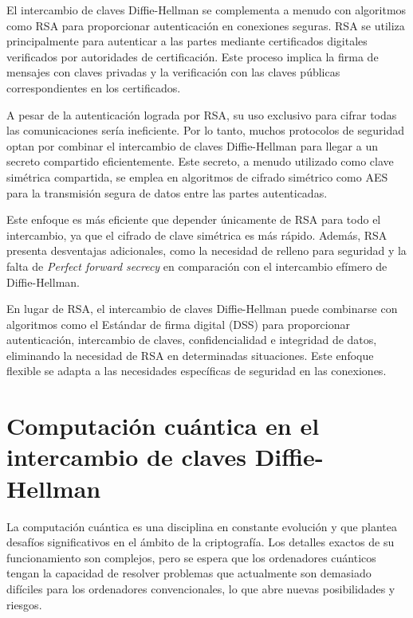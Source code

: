 \documentclass[11pt]{article}
\begin{document}
El intercambio de claves Diffie-Hellman se complementa a menudo con algoritmos como RSA para proporcionar autenticación en conexiones seguras. RSA se utiliza principalmente para autenticar a las partes mediante certificados digitales verificados por autoridades de certificación. Este proceso implica la firma de mensajes con claves privadas y la verificación con las claves públicas correspondientes en los certificados.

A pesar de la autenticación lograda por RSA, su uso exclusivo para cifrar todas las comunicaciones sería ineficiente. Por lo tanto, muchos protocolos de seguridad optan por combinar el intercambio de claves Diffie-Hellman para llegar a un secreto compartido eficientemente. Este secreto, a menudo utilizado como clave simétrica compartida, se emplea en algoritmos de cifrado simétrico como AES para la transmisión segura de datos entre las partes autenticadas.

Este enfoque es más eficiente que depender únicamente de RSA para todo el intercambio, ya que el cifrado de clave simétrica es más rápido. Además, RSA presenta desventajas adicionales, como la necesidad de relleno para seguridad y la falta de \emph{Perfect forward secrecy} en comparación con el intercambio efímero de Diffie-Hellman.

En lugar de RSA, el intercambio de claves Diffie-Hellman puede combinarse con algoritmos como el Estándar de firma digital (DSS) para proporcionar autenticación, intercambio de claves, confidencialidad e integridad de datos, eliminando la necesidad de RSA en determinadas situaciones. Este enfoque flexible se adapta a las necesidades específicas de seguridad en las conexiones.


\section{Computación cuántica en el intercambio de claves Diffie-Hellman}

La computación cuántica es una disciplina en constante evolución y que plantea desafíos significativos en el ámbito de la criptografía. Los detalles exactos de su funcionamiento son complejos, pero se espera que los ordenadores cuánticos tengan la capacidad de resolver problemas que actualmente son demasiado difíciles para los ordenadores convencionales, lo que abre nuevas posibilidades y riesgos.
\end{document}
